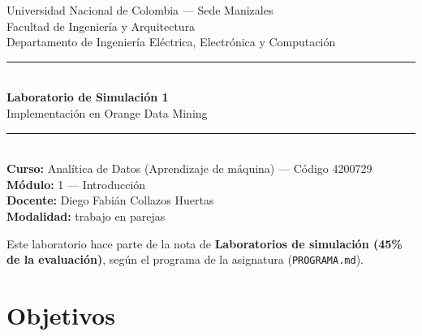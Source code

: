 \documentclass[11pt,letterpaper]{article}
\title{\vspace{-2cm}}
\date{}
\begin{document}
\begin{titlepage}
\centering
\vspace*{1.5cm}

{\Large Universidad Nacional de Colombia --- Sede Manizales}\\[0.2cm]
{\large Facultad de Ingeniería y Arquitectura}\\[0.2cm]
{\large Departamento de Ingeniería Eléctrica, Electrónica y Computación}\\[1.2cm]

\rule{\linewidth}{1pt}\\[0.5cm]
{\huge\bfseries\color{brandblue} Laboratorio de Simulación 1}\\[0.4cm]
{\Large Implementación en Orange Data Mining}\\[0.5cm]
\rule{\linewidth}{1pt}\\[1cm]

{\large \textbf{Curso:} Analítica de Datos (Aprendizaje de máquina) --- Código 4200729}\\[0.3cm]
{\large \textbf{Módulo:} 1 --- Introducción}\\[0.3cm]
{\large \textbf{Docente:} Diego Fabián Collazos Huertas}\\[0.3cm]
{\large \textbf{Modalidad:} trabajo en parejas}\\[1.5cm]

\vfill

{\small Este laboratorio hace parte de la nota de \textbf{Laboratorios de simulación (45\% de la evaluación)}, según el programa de la asignatura (\texttt{PROGRAMA.md}).}

\end{titlepage}

\section{Objetivos}
\end{document}
